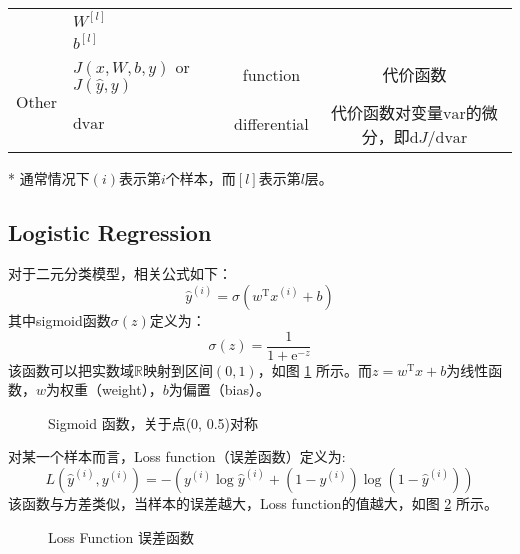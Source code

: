 \begin{table}[h]
\begin{threeparttable}
\begin{tabular}{clcc}
									 & $W^{[l]}$                                 &                      &                                                                    \\
									 & $b^{[l]}$                                 &                      &                                                                    \\ \hline
			\multirow{2}{*}{Other}   & $J(x,W,b,y)$ or $J(\hat{y},y)$            & function             & 代价函数                                                               \\
									 & $\mathrm{d}\mathrm{var}$                  & differential         & 代价函数对变量$\mathrm{var}$的微分，即${\mathrm{d}J}/{\mathrm{d}\mathrm{var}}$ \\ \hline
		\end{tabular}
		\label{tab:notations} %
    	\begin{tablenotes}
      		\item[*] 通常情况下$(i)$表示第$i$个样本，而$[l]$表示第$l$层。
    	\end{tablenotes}
		\end{threeparttable}
	\end{table}

	\subsection{Logistic Regression}

	对于二元分类模型，相关公式如下：
	\begin{equation}
		\hat{y}^{(i)} = \sigma(w^\mathrm{T} x^{(i)} + b) \label{eq:logistic}
	\end{equation}
	其中sigmoid函数$\sigma(z)$定义为：
	\begin{equation}
		\sigma(z) = \frac{1}{1 + \mathrm{e}^{-z}} \label{eq:sigmoid}
	\end{equation}
	该函数可以把实数域$\mathbb{R}$映射到区间$(0, 1)$，如图 \ref{fig:sigmoid} 所示。而$z = w^\mathrm{T} x + b$为线性函数，$w$为权重（weight），$b$为偏置（bias）。
	\begin{figure}[h]
		\centering
		
		\caption{Sigmoid 函数，关于点(0, 0.5)对称}
		\label{fig:sigmoid}
	\end{figure}

	\vspace{0.5\baselineskip}
	对某一个样本而言，Loss function（误差函数）定义为:
	\begin{equation}
		L(\hat{y}^{(i)}, y^{(i)}) = -(y^{(i)} \log \hat{y}^{(i)} + (1 - y^{(i)}) \log (1 - \hat{y}^{(i)})) \label{eq:loss}
	\end{equation}
	该函数与方差类似，当样本的误差越大，Loss function的值越大，如图 \ref{fig:loss} 所示。
	\begin{figure}[h]
		\centering
		
		\caption{Loss Function 误差函数}
		\label{fig:loss}
	\end{figure}


